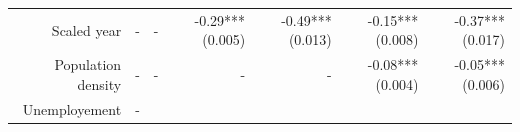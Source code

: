 \documentclass[]{article}
\begin{document}
\begin{longtable}[c]{@{}rrrrrrr@{}}
\begin{minipage}[t]{0.12\columnwidth}
Scaled year
\strut\end{minipage} &
\begin{minipage}[t]{0.11\columnwidth}\raggedleft\strut
-
\strut\end{minipage} &
\begin{minipage}[t]{0.12\columnwidth}\raggedleft\strut
-
\strut\end{minipage} &
\begin{minipage}[t]{0.11\columnwidth}\raggedleft\strut
-0.29*** (0.005)
\strut\end{minipage} &
\begin{minipage}[t]{0.12\columnwidth}\raggedleft\strut
-0.49*** (0.013)
\strut\end{minipage} &
\begin{minipage}[t]{0.11\columnwidth}\raggedleft\strut
-0.15*** (0.008)
\strut\end{minipage} &
\begin{minipage}[t]{0.11\columnwidth}\raggedleft\strut
-0.37*** (0.017)
\strut\end{minipage}\tabularnewline
\begin{minipage}[t]{0.12\columnwidth}\raggedleft\strut
Population density
\strut\end{minipage} &
\begin{minipage}[t]{0.11\columnwidth}\raggedleft\strut
-
\strut\end{minipage} &
\begin{minipage}[t]{0.12\columnwidth}\raggedleft\strut
-
\strut\end{minipage} &
\begin{minipage}[t]{0.11\columnwidth}\raggedleft\strut
-
\strut\end{minipage} &
\begin{minipage}[t]{0.12\columnwidth}\raggedleft\strut
-
\strut\end{minipage} &
\begin{minipage}[t]{0.11\columnwidth}\raggedleft\strut
-0.08*** (0.004)
\strut\end{minipage} &
\begin{minipage}[t]{0.11\columnwidth}\raggedleft\strut
-0.05*** (0.006)
\strut\end{minipage}\tabularnewline
\begin{minipage}[t]{0.12\columnwidth}\raggedleft\strut
Unemployement
\strut\end{minipage} &
\begin{minipage}[t]{0.11\columnwidth}\raggedleft\strut
-
\strut\end{minipage} &

\end{longtable}
\end{document}
